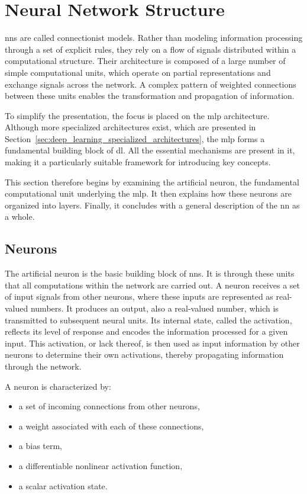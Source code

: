\section{Neural Network Structure}\label{sec:deep_learning_neural_network_structure}

\glspl{nn} are called connectionist models.
Rather than modeling information processing through a set of explicit rules, they rely on a flow of signals distributed within a computational structure.
Their architecture is composed of a large number of simple computational units, which operate on partial representations and exchange signals across the network.
A complex pattern of weighted connections between these units enables the transformation and propagation of information.

To simplify the presentation, the focus is placed on the \gls{mlp} architecture.
Although more specialized architectures exist, which are presented in Section~\ref{sec:deep_learning_specialized_architectures}, the \gls{mlp} forms a fundamental building block of \gls{dl}.
All the essential mechanisms are present in it, making it a particularly suitable framework for introducing key concepts.

This section therefore begins by examining the artificial neuron, the fundamental computational unit underlying the \gls{mlp}.
It then explains how these neurons are organized into layers.
Finally, it concludes with a general description of the \gls{nn} as a whole.

\subsection{Neurons}

The artificial neuron is the basic building block of \glspl{nn}.
It is through these units that all computations within the network are carried out.
A neuron receives a set of input signals from other neurons, where these inputs are represented as real-valued numbers.
It produces an output, also a real-valued number, which is transmitted to subsequent neural units.
Its internal state, called the activation, reflects its level of response and encodes the information processed for a given input.
This activation, or lack thereof, is then used as input information by other neurons to determine their own activations, thereby propagating information through the network.

A neuron is characterized by:
\begin{itemize}
\item a set of incoming connections from other neurons,
\item a weight associated with each of these connections,
\item a bias term,
\item a differentiable nonlinear activation function,
\item a scalar activation state.
\end{itemize}


